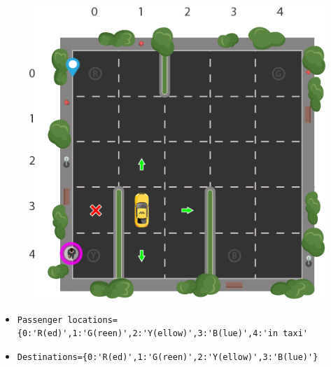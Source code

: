 \begin{frame}[fragile]
\begin{figure}
\vspace{-0.5cm}
  \begin{center}
    \includegraphics[width=0.9\linewidth]{img/qlearning}
  \end{center}
\end{figure}
\begin{itemize}
 \item \verb?Passenger locations={0:'R(ed)',1:'G(reen)',2:'Y(ellow)',3:'B(lue)',4:'in taxi'?
 \item \verb?Destinations={0:'R(ed)',1:'G(reen)',2:'Y(ellow)',3:'B(lue)'}?
\end{itemize}

\end{frame}

